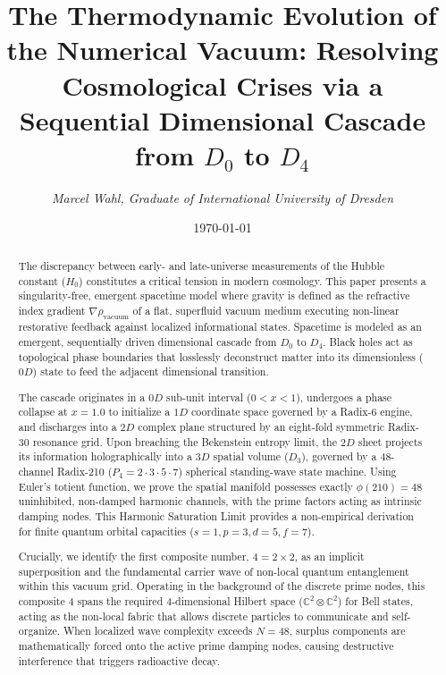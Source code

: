 \documentclass[11pt,a4paper]{article}
\title{\textbf{The Thermodynamic Evolution of the Numerical Vacuum: Resolving Cosmological Crises via a Sequential Dimensional Cascade from $D_0$ to $D_4$}}
\author{\textit{Marcel Wahl, Graduate of International University of Dresden}}
\date{\today}
\theoremstyle{plain}
\theoremstyle{definition}
\theoremstyle{remark}
\begin{document}
\maketitle

\begin{abstract}
The discrepancy between early- and late-universe measurements of the Hubble constant ($H_0$) constitutes a critical tension in modern cosmology. This paper presents a singularity-free, emergent spacetime model where gravity is defined as the refractive index gradient $\nabla\rho_{\text{vacuum}}$ of a flat, superfluid vacuum medium executing non-linear restorative feedback against localized informational states. Spacetime is modeled as an emergent, sequentially driven dimensional cascade from $D_0$ to $D_4$. Black holes act as topological phase boundaries that losslessly deconstruct matter into its dimensionless ($0D$) state to feed the adjacent dimensional transition.

The cascade originates in a $0D$ sub-unit interval ($0 < x < 1$), undergoes a phase collapse at $x = 1.0$ to initialize a $1D$ coordinate space governed by a Radix-6 engine, and discharges into a $2D$ complex plane structured by an eight-fold symmetric Radix-30 resonance grid. Upon breaching the Bekenstein entropy limit, the $2D$ sheet projects its information holographically into a $3D$ spatial volume ($D_3$), governed by a 48-channel Radix-210 ($P_4 = 2 \cdot 3 \cdot 5 \cdot 7$) spherical standing-wave state machine. Using Euler's totient function, we prove the spatial manifold possesses exactly $\phi(210) = 48$ uninhibited, non-damped harmonic channels, with the prime factors acting as intrinsic damping nodes. This Harmonic Saturation Limit provides a non-empirical derivation for finite quantum orbital capacities ($s=1, p=3, d=5, f=7$).

Crucially, we identify the first composite number, $4 = 2 \times 2$, as an implicit superposition and the fundamental carrier wave of non-local quantum entanglement within this vacuum grid. Operating in the background of the discrete prime nodes, this composite 4 spans the required 4-dimensional Hilbert space ($\mathbb{C}^2 \otimes \mathbb{C}^2$) for Bell states, acting as the non-local fabric that allows discrete particles to communicate and self-organize. When localized wave complexity exceeds $N = 48$, surplus components are mathematically forced onto the active prime damping nodes, causing destructive interference that triggers radioactive decay.


\end{abstract}
\end{document}
